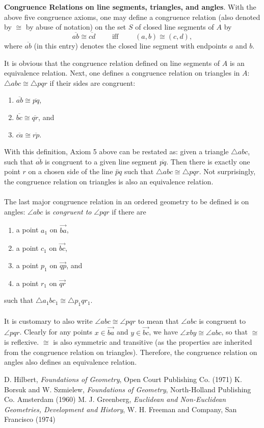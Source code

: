 \documentclass[12pt]{article}
\renewcommand{\line}[1]{\overleftrightarrow{#1}}
\newcommand{\ray}[1]{\overrightarrow{#1}}
\begin{document}
\textbf{Congruence Relations on line segments, triangles, and
angles}. With the above five congruence axioms, one may define a
congruence relation (also denoted by $\cong$ by abuse of notation)
on the set $S$ of closed line segments of $A$ by
$$\overline{ab}\cong\overline{cd}\qquad \mbox{ iff }\qquad (a,b)\cong (c,d),$$
where $\overline{ab}$ (in this entry) denotes the closed line
segment with endpoints $a$ and $b$.

It is obvious that the congruence relation defined on line segments
of $A$ is an equivalence relation.  Next, one defines a congruence
relation on triangles in $A$: $\triangle abc\cong \triangle pqr$ if
their sides are congruent:
\begin{enumerate}
\item $\overline{ab}\cong\overline{pq}$,
\item $\overline{bc}\cong\overline{qr}$, and
\item $\overline{ca}\cong\overline{rp}$.
\end{enumerate}
With this definition, Axiom 5 above can be restated as: given a
triangle $\triangle abc$, such that $\overline{ab}$ is congruent to
a given line segment $\overline{pq}$.  Then there is exactly one
point $r$ on a chosen side of the line $\line{pq}$ such that
$\triangle abc\cong\triangle pqr$.  Not surprisingly, the congruence
relation on triangles is also an equivalence relation.
\\\\
The last major congruence relation in an ordered geometry to be
defined is on angles: $\angle abc$ is \emph{congruent to} $\angle
pqr$ if there are
\begin{enumerate}
\item a point $a_1$ on $\ray{ba}$,
\item a point $c_1$ on $\ray{bc}$,
\item a point $p_1$ on $\ray{qp}$, and
\item a point $r_1$ on $\ray{qr}$
\end{enumerate}
such that $\triangle a_1bc_1\cong \triangle p_1qr_1$.
\\\\
It is customary to also write $\angle abc\cong \angle pqr$ to mean
that $\angle abc$ is congruent to $\angle pqr$.  Clearly for any
points $x\in\ray{ba}$ and $y\in\ray{bc}$, we have $\angle xby\cong
\angle abc$, so that $\cong$ is reflexive.  $\cong$ is also
symmetric and transitive (as the properties are inherited from the
congruence relation on triangles).  Therefore, the congruence
relation on angles also defines an equivalence relation.

\begin{thebibliography}{6}
 D. Hilbert, {\it Foundations of Geometry}, Open Court Publishing Co. (1971)
 K. Borsuk and W. Szmielew, {\it Foundations of Geometry}, North-Holland Publishing Co. Amsterdam (1960)
 M. J. Greenberg, {\it Euclidean and Non-Euclidean Geometries, Development and History}, W. H. Freeman and Company, San Francisco (1974)
\end{thebibliography}
\end{document}
